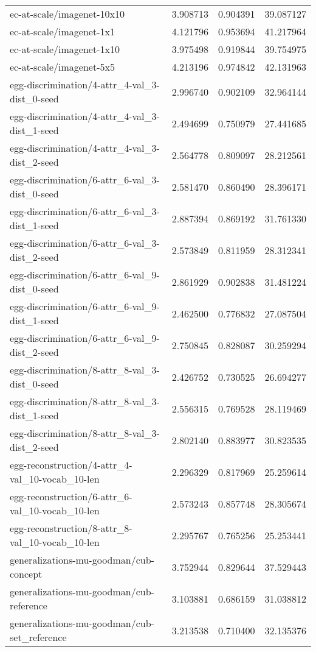 \begin{tabular}{lrrr}
ec-at-scale/imagenet-10x10 & 3.908713 & 0.904391 & 39.087127 \\
ec-at-scale/imagenet-1x1 & 4.121796 & 0.953694 & 41.217964 \\
ec-at-scale/imagenet-1x10 & 3.975498 & 0.919844 & 39.754975 \\
ec-at-scale/imagenet-5x5 & 4.213196 & 0.974842 & 42.131963 \\
egg-discrimination/4-attr\_4-val\_3-dist\_0-seed & 2.996740 & 0.902109 & 32.964144 \\
egg-discrimination/4-attr\_4-val\_3-dist\_1-seed & 2.494699 & 0.750979 & 27.441685 \\
egg-discrimination/4-attr\_4-val\_3-dist\_2-seed & 2.564778 & 0.809097 & 28.212561 \\
egg-discrimination/6-attr\_6-val\_3-dist\_0-seed & 2.581470 & 0.860490 & 28.396171 \\
egg-discrimination/6-attr\_6-val\_3-dist\_1-seed & 2.887394 & 0.869192 & 31.761330 \\
egg-discrimination/6-attr\_6-val\_3-dist\_2-seed & 2.573849 & 0.811959 & 28.312341 \\
egg-discrimination/6-attr\_6-val\_9-dist\_0-seed & 2.861929 & 0.902838 & 31.481224 \\
egg-discrimination/6-attr\_6-val\_9-dist\_1-seed & 2.462500 & 0.776832 & 27.087504 \\
egg-discrimination/6-attr\_6-val\_9-dist\_2-seed & 2.750845 & 0.828087 & 30.259294 \\
egg-discrimination/8-attr\_8-val\_3-dist\_0-seed & 2.426752 & 0.730525 & 26.694277 \\
egg-discrimination/8-attr\_8-val\_3-dist\_1-seed & 2.556315 & 0.769528 & 28.119469 \\
egg-discrimination/8-attr\_8-val\_3-dist\_2-seed & 2.802140 & 0.883977 & 30.823535 \\
egg-reconstruction/4-attr\_4-val\_10-vocab\_10-len & 2.296329 & 0.817969 & 25.259614 \\
egg-reconstruction/6-attr\_6-val\_10-vocab\_10-len & 2.573243 & 0.857748 & 28.305674 \\
egg-reconstruction/8-attr\_8-val\_10-vocab\_10-len & 2.295767 & 0.765256 & 25.253441 \\
generalizations-mu-goodman/cub-concept & 3.752944 & 0.829644 & 37.529443 \\
generalizations-mu-goodman/cub-reference & 3.103881 & 0.686159 & 31.038812 \\
generalizations-mu-goodman/cub-set\_reference & 3.213538 & 0.710400 & 32.135376 \\

\end{tabular}
